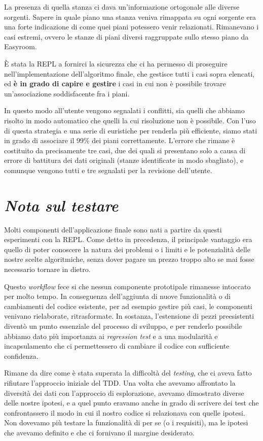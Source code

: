 \documentclass[12pt]{report}
\begin{document}
La presenza di quella stanza ci dava un'informazione ortogonale 
alle diverse sorgenti. Sapere in quale piano una stanza veniva rimappata 
su ogni sorgente era una forte indicazione di come quei piani potessero
venir relazionati. Rimanevano i casi estremi, ovvero 
le stanze di piani diversi raggruppate sullo stesso piano da Easyroom. 

È stata la REPL a fornirci la sicurezza che ci ha permesso di
proseguire nell'implementazione dell'algoritmo finale, che gestisce tutti i
casi sopra elencati, ed \textbf{è in grado di capire e gestire} i casi in
cui non è possibile trovare un'associazione soddisfacente fra i piani. 

In questo modo all'utente vengono segnalati i conflitti, sia quelli
che abbiamo risolto in modo automatico che quelli la cui risoluzione
non è possibile. Con l'uso di questa strategia e una serie di
euristiche per renderla più efficiente, siamo stati in grado di
associare il 99\% dei piani correttamente. L'errore che rimane
è costituito da precisamente tre casi, due dei quali si presentano solo a
causa di errore di battitura dei dati originali (stanze identificate in
modo sbagliato), e comunque vengono tutti e tre segnalati per la
revisione dell'utente. 

\section{\textit{Nota sul testare}}

Molti componenti dell'applicazione finale sono nati a partire da
questi esperimenti con la REPL. Come detto in precedenza, 
il principale vantaggio era quello di poter 
conoscere la natura dei problemi o i limiti e le potenzialità 
delle nostre scelte algoritmiche, senza dover pagare un prezzo 
troppo alto se mai fosse necessario tornare in dietro.

Questo \textit{workflow} fece si che nessun componente prototipale
rimanesse intoccato per molto tempo. In conseguenza dell'aggiunta di
nuove funzionalità o di cambiamenti del codice esistente, per ad
esempio gestire più casi, le componenti venivano rielaborate,
ritrasformate. In sostanza, l'estensione di pezzi
preesistenti diventò un punto essenziale del
processo di sviluppo, e per renderlo possibile abbiamo dato più 
importanza ai \textit{regression test} e a una 
modularità e incapsulamento che ci permettessero di 
cambiare il codice con sufficiente confidenza. 

Rimane da dire come è stata superata la difficoltà del \textit{testing}, che
ci aveva fatto rifiutare l'approccio iniziale del TDD. Una volta che avevamo
affrontato la diversità dei dati con l'approccio di esplorazione, avevamo
dimostrato diverse delle nostre ipotesi, e a quel punto eravamo anche in grado
di scrivere dei test che confrontassero il modo in cui il nostro codice si
relazionava con quelle ipotesi. Non dovevamo più testare la funzionalità di
per se (o i requisiti), ma le ipotesi che avevamo definito e che ci fornivano
il margine desiderato. 
\end{document}
